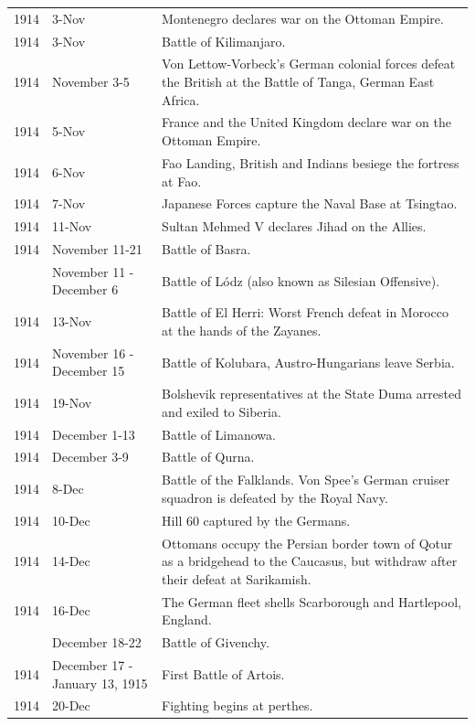 \documentclass[
  openany]{book}
\begin{document}
\begin{longtable}[t]{rl>{\raggedright\arraybackslash}p{22em}}
1914 & 3-Nov & Montenegro declares war on the Ottoman Empire.\\
\rowcolor{gray!6}  1914 & 3-Nov & Battle of Kilimanjaro.\\
1914 & November 3-5 & Von Lettow-Vorbeck's German colonial forces defeat the British at the Battle of Tanga, German East Africa.\\
\addlinespace
\rowcolor{gray!6}  1914 & 5-Nov & France and the United Kingdom declare war on the Ottoman Empire.\\
1914 & 6-Nov & Fao Landing, British and Indians besiege the fortress at Fao.\\
\rowcolor{gray!6}  1914 & 7-Nov & Japanese Forces capture the Naval Base at Tsingtao.\\
1914 & 11-Nov & Sultan Mehmed V declares Jihad on the Allies.\\
\rowcolor{gray!6}  1914 & November 11-21 & Battle of Basra.\\
\addlinespace
1914 & November 11 - December 6 & Battle of Lódz (also known as Silesian Offensive).\\
\rowcolor{gray!6}  1914 & 13-Nov & Battle of El Herri: Worst French defeat in Morocco at the hands of the Zayanes.\\
1914 & November 16 - December 15 & Battle of Kolubara, Austro-Hungarians leave Serbia.\\
\rowcolor{gray!6}  1914 & 19-Nov & Bolshevik representatives at the State Duma arrested and exiled to Siberia.\\
1914 & December 1-13 & Battle of Limanowa.\\
\addlinespace
\rowcolor{gray!6}  1914 & December 3-9 & Battle of Qurna.\\
1914 & 8-Dec & Battle of the Falklands. Von Spee's German cruiser squadron is defeated by the Royal Navy.\\
\rowcolor{gray!6}  1914 & 10-Dec & Hill 60 captured by the Germans.\\
1914 & 14-Dec & Ottomans occupy the Persian border town of Qotur as a bridgehead to the Caucasus, but withdraw after their defeat at Sarikamish.\\
\rowcolor{gray!6}  1914 & 16-Dec & The German fleet shells Scarborough and Hartlepool, England.\\
\addlinespace
1914 & December 18-22 & Battle of Givenchy.\\
\rowcolor{gray!6}  1914 & December 17 - January 13, 1915 & First Battle of Artois.\\
1914 & 20-Dec & Fighting begins at perthes.\\

\end{longtable}
\end{document}
